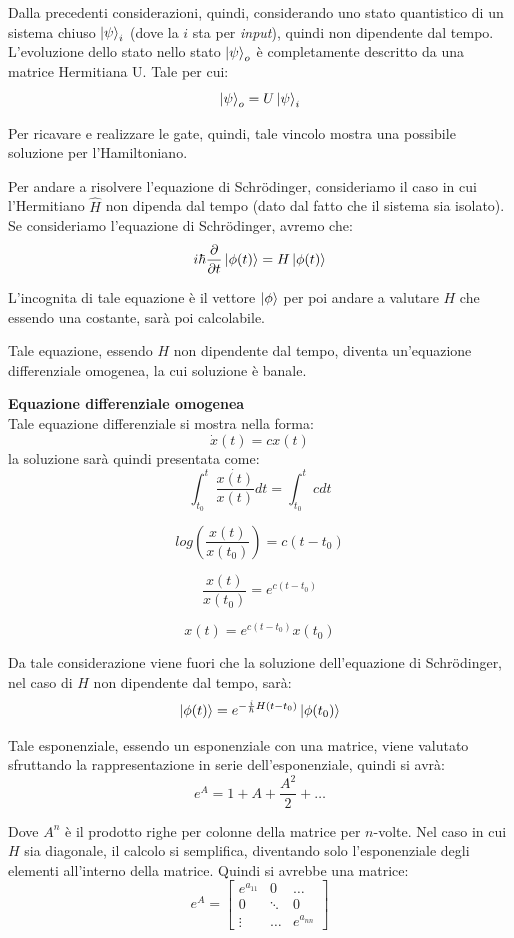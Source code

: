 Dalla precedenti considerazioni, quindi, considerando uno stato quantistico di un sistema chiuso \(\ket{\psi}_i\) (dove la \(i\) sta per \textit{input}), quindi non dipendente dal tempo. L'evoluzione dello stato nello stato \(\ket{\psi}_o\) è completamente descritto da una matrice Hermitiana U. Tale per cui:
\[
\ket{\psi}_o = U \ket{\psi}_i
\]

Per ricavare e realizzare le gate, quindi, tale vincolo mostra una possibile soluzione per l'Hamiltoniano.

Per andare a risolvere l'equazione di Schrödinger, consideriamo il caso in cui l'Hermitiano \(\hat{H}\) non dipenda dal tempo (dato dal fatto che il sistema sia isolato). Se consideriamo l'equazione di Schrödinger, avremo che:
\[
i \hbar \frac{\partial}{\partial t} \ket{\phi(t)} = H \ket{\phi(t)}
\]

L'incognita di tale equazione è il vettore \(\ket{\phi}\) per poi andare a valutare \(H\) che essendo una costante, sarà poi calcolabile.

Tale equazione, essendo \(H\) non dipendente dal tempo, diventa un'equazione differenziale omogenea, la cui soluzione è banale.

\begin{info}
\textbf{Equazione differenziale omogenea} \\
Tale equazione differenziale si mostra nella forma:
\[
\dot{x}(t) = c x(t)
\]
la soluzione sarà quindi presentata come:
\[
\int_{t_0}^{t} \frac{\dot{x(t)}}{x(t)} dt = \int_{t_0}^{t} c dt
\]

\[
log(\frac{x(t)}{x(t_0)}) = c (t - t_0)
\]

\[
\frac{x(t)}{x(t_0)} = e^{c(t-t_0)}
\]

\[
x(t)=e^{c(t-t_0)}x(t_0)
\]
\end{info}

Da tale considerazione viene fuori che la soluzione dell'equazione di Schrödinger, nel caso di \(H\) non dipendente dal tempo, sarà:
\[
\ket{\phi(t)} = e^{-\frac{i}{\hbar} H (t-t_0)}\ket{\phi(t_0)}
\]

Tale esponenziale, essendo un esponenziale con una matrice, viene valutato sfruttando la rappresentazione in serie dell'esponenziale, quindi si avrà:
\[
e^A = 1 + A + \frac{A^2}{2} + \dots
\]

Dove \(A^n\) è il prodotto righe per colonne della matrice per \(n\)-volte. Nel caso in cui \(H\) sia diagonale, il calcolo si semplifica, diventando solo l'esponenziale degli elementi all'interno della matrice. Quindi si avrebbe una matrice:
\[
e^A = 
\begin{bmatrix}
e^{a_{11}} & 0 & \dots \\
0 & \ddots & 0 \\
\vdots & \dots & e^{a_{nn}}    
\end{bmatrix}
\]

